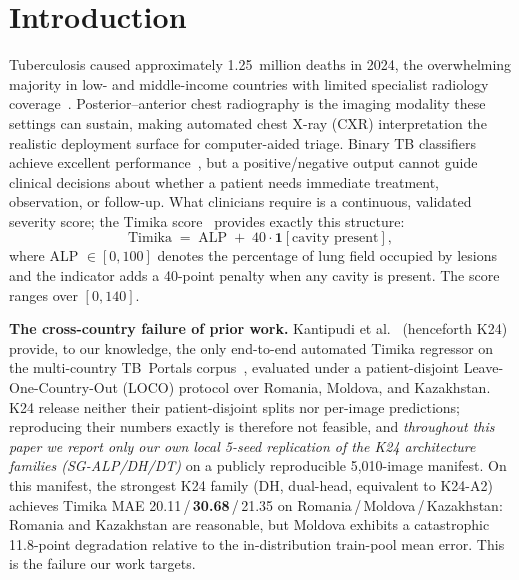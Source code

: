 \documentclass[runningheads]{llncs}
\begin{document}
\section{Introduction}

Tuberculosis caused approximately 1.25~million deaths in 2024, the overwhelming majority in low- and middle-income countries with limited specialist radiology coverage~\cite{who2024tb}. Posterior--anterior chest radiography is the imaging modality these settings can sustain, making automated chest X-ray (CXR) interpretation the realistic deployment surface for computer-aided triage. Binary TB classifiers achieve excellent performance~\cite{liu2020tbx11k}, but a positive/negative output cannot guide clinical decisions about whether a patient needs immediate treatment, observation, or follow-up. What clinicians require is a continuous, validated severity score; the Timika score~\cite{ralph2010timika} provides exactly this structure:
\begin{equation}
\text{Timika} \;=\; \mathrm{ALP} \;+\; 40 \cdot \mathbf{1}[\text{cavity present}],
\label{eq:timika}
\end{equation}
where ALP $\in [0,100]$ denotes the percentage of lung field occupied by lesions and the indicator adds a 40-point penalty when any cavity is present. The score ranges over $[0,140]$.

\smallskip\noindent\textbf{The cross-country failure of prior work.}
Kantipudi et al.~\cite{kantipudi2024} (henceforth K24) provide, to our knowledge, the only end-to-end automated Timika regressor on the multi-country TB~Portals corpus~\cite{tbportals2020}, evaluated under a patient-disjoint Leave-One-Country-Out (LOCO) protocol over Romania, Moldova, and Kazakhstan. K24 release neither their patient-disjoint splits nor per-image predictions; reproducing their numbers exactly is therefore not feasible, and \emph{throughout this paper we report only our own local 5-seed replication of the K24 architecture families (SG-ALP/DH/DT)} on a publicly reproducible 5{,}010-image manifest. On this manifest, the strongest K24 family (DH, dual-head, equivalent to K24-A2) achieves Timika MAE 20.11\,/\,\textbf{30.68}\,/\,21.35 on Romania\,/\,Moldova\,/\,Kazakhstan: Romania and Kazakhstan are reasonable, but Moldova exhibits a catastrophic 11.8-point degradation relative to the in-distribution train-pool mean error. This is the failure our work targets.
\end{document}
